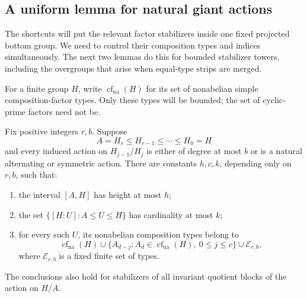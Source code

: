 \subsection{A uniform lemma for natural giant actions}

The shortcuts will put the relevant factor stabilizers inside one fixed
projected bottom group. We need to control their composition types and
indices simultaneously. The next two lemmas do this for bounded
stabilizer towers, including the overgroups that arise when equal-type
strips are merged.

For a finite group $H$, write $\operatorname{cf}_{\mathrm{na}}(H)$
for its set of nonabelian simple composition-factor types.  Only these
types will be bounded; the set of cyclic-prime factors need not be.

\begin{lemma}\label{cls:routes}
Fix positive integers $r,b$.  Suppose
\[
 A=H_r\leq H_{r-1}\leq\cdots\leq H_0=H
\]
and every induced action on $H_{j-1}/H_j$ is either of degree at most
$b$ or is a natural alternating or symmetric action.  There are
constants $h,c,k$, depending only on $r,b$, such that:
\begin{enumerate}[label=\textup{(\roman*)}]
\item the interval $[A,H]$ has height at most $h$;
\item the set $\{[H:U]:A\leq U\leq H\}$ has cardinality at most $k$;
\item for every such $U$, its nonabelian composition types belong to
\[
 \operatorname{cf}_{\mathrm{na}}(H)
 \cup\{A_{d-j}:A_d\in\operatorname{cf}_{\mathrm{na}}(H),\ 0\leq j\leq c\}
 \cup\mathcal E_{r,b},
\]
where $\mathcal E_{r,b}$ is a fixed finite set of types.
\end{enumerate}
The conclusions also hold for stabilizers of all invariant quotient
blocks of the action on $H/A$.
\end{lemma}
